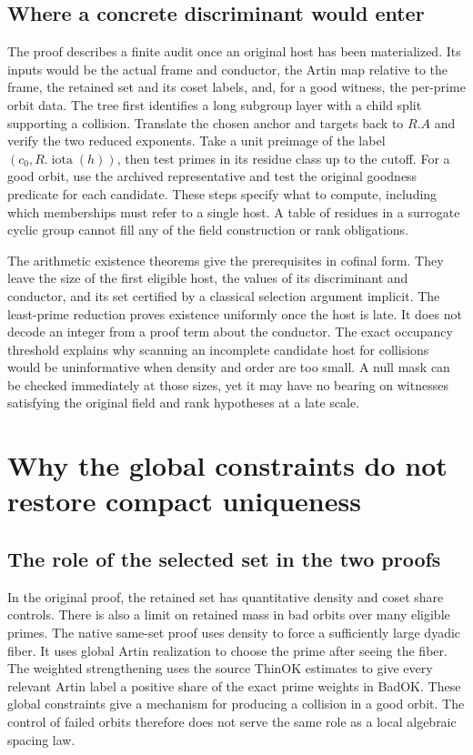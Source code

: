 \documentclass[12pt,letterpaper]{article}
\DeclareRobustCommand{\id}[1]{\mbox{\small\ttfamily #1}}
\begin{document}
\subsection{Where a concrete discriminant would enter}

The proof describes a finite audit once an original host has been materialized. Its inputs would be the actual frame and conductor, the Artin map relative to the frame, the retained set and its coset labels, and, for a good witness, the per-prime orbit data. The tree first identifies a long subgroup layer with a child split supporting a collision. Translate the chosen anchor and targets back to \(R.A\) and verify the two reduced exponents. Take a unit preimage of the label \((c_0,R.\operatorname{iota}(h))\), then test primes in its residue class up to the cutoff. For a good orbit, use the archived representative and test the original goodness predicate for each candidate. These steps specify what to compute, including which memberships must refer to a single host. A table of residues in a surrogate cyclic group cannot fill any of the field construction or rank obligations.

The arithmetic existence theorems give the prerequisites in cofinal form. They leave the size of the first eligible host, the values of its discriminant and conductor, and its set certified by a classical selection argument implicit. The least-prime reduction proves existence uniformly once the host is late. It does not decode an integer from a proof term about the conductor. The exact occupancy threshold explains why scanning an incomplete candidate host for collisions would be uninformative when density and order are too small. A null mask can be checked immediately at those sizes, yet it may have no bearing on witnesses satisfying the original field and rank hypotheses at a late scale.

\section{Why the global constraints do not restore compact uniqueness}
\label{sec:compare}

\subsection{The role of the selected set in the two proofs}

In the original proof, the retained set has quantitative density and coset share controls. There is also a limit on retained mass in bad orbits over many eligible primes. The native same-set proof uses density to force a sufficiently large dyadic fiber. It uses global Artin realization to choose the prime after seeing the fiber. The weighted strengthening uses the source \id{ThinOK} estimates to give every relevant Artin label a positive share of the exact prime weights in \id{BadOK}. These global constraints give a mechanism for producing a collision in a good orbit. The control of failed orbits therefore does not serve the same role as a local algebraic spacing law.
\end{document}
